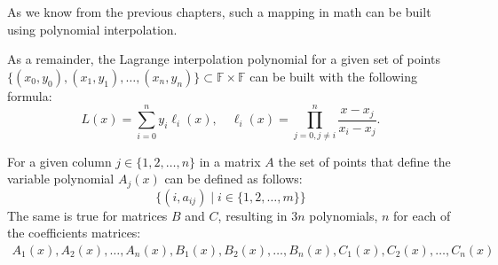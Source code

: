 \documentclass[../lecture-notes.tex]{subfiles}
\begin{document}
\begin{example}
\begin{center}
    \end{center}
\end{example}

As we know from the previous chapters, such a mapping in math can be built using polynomial 
interpolation.

\begin{remark}
    As a remainder, the Lagrange interpolation polynomial for a given set of points 
    $\{(x_0,y_0),(x_1,y_1),\dots,(x_n,y_n)\} \subset \mathbb{F} \times \mathbb{F}$
    can be built with the following formula:
    \begin{equation*}
        L(x) = \sum_{i=0}^{n} y_i \ell_i(x), \quad \ell_i(x) = \prod_{j=0, j \neq i}^{n} \frac{x-x_j}{x_i-x_j}.
    \end{equation*}  
\end{remark}

For a given column $j \in \{1, 2, \dots, n\}$ in a matrix $A$ the set of points that define the
variable polynomial $A_j(x)$ can be defined as follows:
\begin{equation*}
    \{(i, a_{ij}) \mid i \in \{1, 2, \dots, m\}\}
\end{equation*}
The same is true for matrices $B$ and $C$, resulting in $3n$ polynomials, $n$ for each of the
coefficients matrices:
\begin{align*}
    A_1(x), A_2(x), \dots, A_n(x), 
    B_1(x), B_2(x), \dots, B_n(x),
    C_1(x), C_2(x), \dots, C_n(x)
\end{align*}
\end{document}
